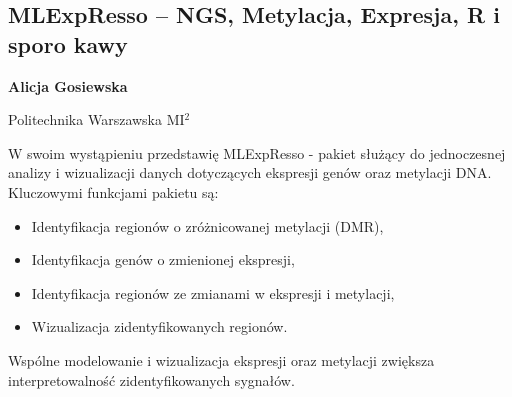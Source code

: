 \documentclass[\main/boa.tex]{subfiles}
\begin{document}
\subsection{MLExpResso – NGS, Metylacja, Expresja, R i sporo kawy}

\begin{minipage}{0.915\textwidth}
	\centering
  {\bf {} Alicja Gosiewska}
\end{minipage}


\begin{affiliations}
\begin{minipage}{0.915\textwidth}
\centering
Politechnika Warszawska MI$^{2}$ \\[-2pt]
\end{minipage}
\end{affiliations}

\vskip 0.3cm

 W swoim wystąpieniu przedstawię MLExpResso - pakiet służący do jednoczesnej analizy i wizualizacji danych dotyczących ekspresji genów oraz metylacji DNA. 
 Kluczowymi funkcjami pakietu są: 
 \begin{itemize}[noitemsep]
 \item Identyfikacja regionów o zróżnicowanej metylacji (DMR), 
 \item Identyfikacja genów o zmienionej ekspresji, 
 \item Identyfikacja regionów ze zmianami w ekspresji i metylacji,
 \item Wizualizacja zidentyfikowanych regionów.
 \end{itemize}
 
 Wspólne modelowanie i wizualizacja ekspresji oraz metylacji zwiększa interpretowalność zidentyfikowanych sygnałów.
 
\end{document}
